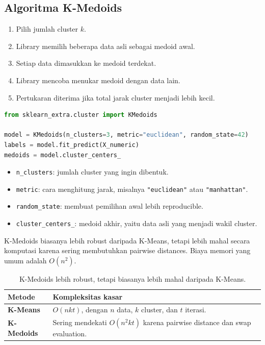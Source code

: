 \documentclass{article}
\newcommand{\code}[1]{\texttt{#1}}
\begin{document}
\subsection{Algoritma K-Medoids}
\begin{enumerate}[leftmargin=*]
    \item Pilih jumlah cluster $k$.
    \item Library memilih beberapa data asli sebagai medoid awal.
    \item Setiap data dimasukkan ke medoid terdekat.
    \item Library mencoba menukar medoid dengan data lain.
    \item Pertukaran diterima jika total jarak cluster menjadi lebih kecil.
\end{enumerate}
\begin{lstlisting}[language=Python]
from sklearn_extra.cluster import KMedoids

model = KMedoids(n_clusters=3, metric="euclidean", random_state=42)
labels = model.fit_predict(X_numeric)
medoids = model.cluster_centers_
\end{lstlisting}
\begin{itemize}[leftmargin=*]
    \item \code{n\_clusters}: jumlah cluster yang ingin dibentuk.
    \item \code{metric}: cara menghitung jarak, misalnya \code{"euclidean"} atau \code{"manhattan"}.
    \item \code{random\_state}: membuat pemilihan awal lebih reproducible.
    \item \code{cluster\_centers\_}: medoid akhir, yaitu data asli yang menjadi wakil cluster.
\end{itemize}

K-Medoids biasanya lebih robust daripada K-Means, tetapi lebih mahal secara komputasi karena sering membutuhkan pairwise distances. Biaya memori yang umum adalah $O(n^2)$.
\begin{table}[H]
\centering
{}
\begin{tabularx}{0.72\textwidth}{>{\bfseries}lX}
\rowcolor{softOrange}
Metode & Kompleksitas kasar \\
\toprule
K-Means & $O(nkt)$, dengan $n$ data, $k$ cluster, dan $t$ iterasi. \\
K-Medoids & Sering mendekati $O(n^2kt)$ karena pairwise distance dan swap evaluation. \\
\bottomrule
\end{tabularx}
\caption{K-Medoids lebih robust, tetapi biasanya lebih mahal daripada K-Means.}
\end{table}
\end{document}
